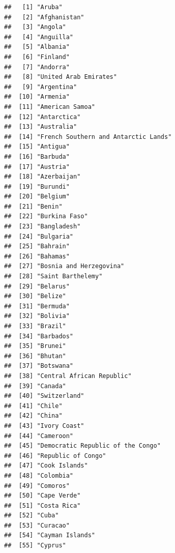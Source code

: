 \documentclass[
]{article}
\begin{document}
\begin{verbatim}
##   [1] "Aruba"                              
##   [2] "Afghanistan"                        
##   [3] "Angola"                             
##   [4] "Anguilla"                           
##   [5] "Albania"                            
##   [6] "Finland"                            
##   [7] "Andorra"                            
##   [8] "United Arab Emirates"               
##   [9] "Argentina"                          
##  [10] "Armenia"                            
##  [11] "American Samoa"                     
##  [12] "Antarctica"                         
##  [13] "Australia"                          
##  [14] "French Southern and Antarctic Lands"
##  [15] "Antigua"                            
##  [16] "Barbuda"                            
##  [17] "Austria"                            
##  [18] "Azerbaijan"                         
##  [19] "Burundi"                            
##  [20] "Belgium"                            
##  [21] "Benin"                              
##  [22] "Burkina Faso"                       
##  [23] "Bangladesh"                         
##  [24] "Bulgaria"                           
##  [25] "Bahrain"                            
##  [26] "Bahamas"                            
##  [27] "Bosnia and Herzegovina"             
##  [28] "Saint Barthelemy"                   
##  [29] "Belarus"                            
##  [30] "Belize"                             
##  [31] "Bermuda"                            
##  [32] "Bolivia"                            
##  [33] "Brazil"                             
##  [34] "Barbados"                           
##  [35] "Brunei"                             
##  [36] "Bhutan"                             
##  [37] "Botswana"                           
##  [38] "Central African Republic"           
##  [39] "Canada"                             
##  [40] "Switzerland"                        
##  [41] "Chile"                              
##  [42] "China"                              
##  [43] "Ivory Coast"                        
##  [44] "Cameroon"                           
##  [45] "Democratic Republic of the Congo"   
##  [46] "Republic of Congo"                  
##  [47] "Cook Islands"                       
##  [48] "Colombia"                           
##  [49] "Comoros"                            
##  [50] "Cape Verde"                         
##  [51] "Costa Rica"                         
##  [52] "Cuba"                               
##  [53] "Curacao"                            
##  [54] "Cayman Islands"                     
##  [55] "Cyprus"                             

\end{verbatim}
\end{document}
